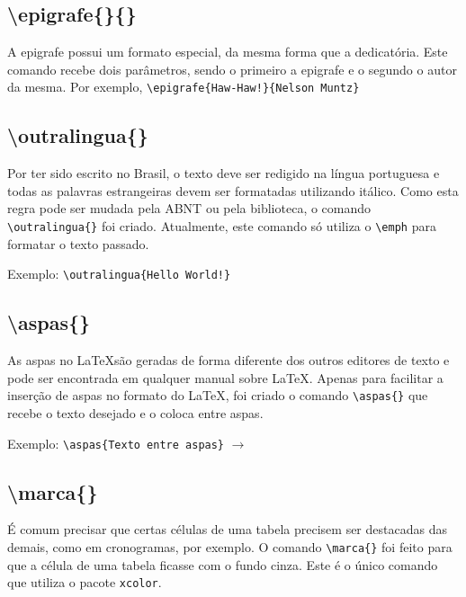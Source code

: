     \subsection{\textbackslash epigrafe\{\}\{\}}
    A epigrafe possui um formato especial, da mesma forma que a dedicatória. Este comando recebe dois parâmetros, sendo o primeiro a epigrafe e o segundo o autor da mesma. Por exemplo, \verb+\epigrafe{Haw-Haw!}{Nelson Muntz}+
    
    \subsection{\textbackslash outralingua\{\}}
    Por ter sido escrito no Brasil, o texto deve ser redigido na língua portuguesa e todas as palavras estrangeiras devem ser formatadas utilizando itálico. Como esta regra pode ser mudada pela ABNT ou pela biblioteca, o comando \verb+\outralingua{}+ foi criado. Atualmente, este comando só utiliza o \verb+\emph+ para formatar o texto passado.
    
    Exemplo: \verb+\outralingua{Hello World!}+
    
    \subsection{\textbackslash aspas\{\}}
    As aspas no \LaTeX são geradas de forma diferente dos outros editores de texto e pode ser encontrada em qualquer manual sobre \LaTeX. Apenas para facilitar a inserção de aspas no formato do \LaTeX, foi criado o comando \verb+\aspas{}+ que recebe o texto desejado e o coloca entre aspas.

    Exemplo: \verb+\aspas{Texto entre aspas}+ $\to$ 
    
    \subsection{\textbackslash marca\{\}}
    É comum precisar que certas células de uma tabela precisem ser destacadas das demais, como em cronogramas, por exemplo. O comando \verb+\marca{}+ foi feito para que a célula de uma tabela ficasse com o fundo cinza. Este é o único comando que utiliza o pacote \verb+xcolor+.

